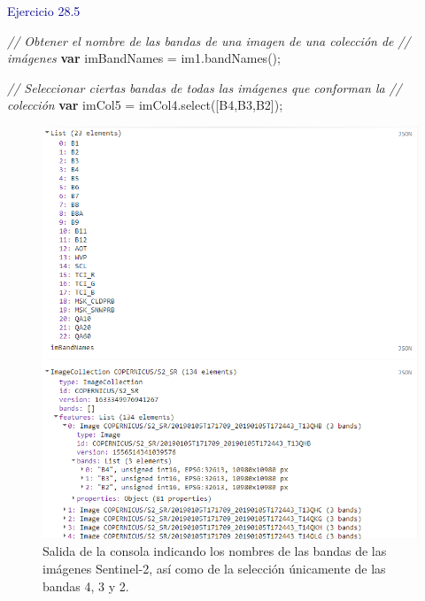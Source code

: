 \documentclass[
  12pt,
  letterpaper,
  twoside]{book}
\newenvironment{Shaded}{\begin{snugshade}}{\end{snugshade}}
\newcommand{\CommentTok}[1]{\textcolor[rgb]{0.24,0.58,0.00}{\textit{#1}}}
\newcommand{\ControlFlowTok}[1]{\textcolor[rgb]{0.00,0.00,0.00}{\textbf{#1}}}
\newcommand{\FunctionTok}[1]{\textcolor[rgb]{0.48,0.12,0.64}{#1}}
\newcommand{\NormalTok}[1]{#1}
\newcommand{\OperatorTok}[1]{\textcolor[rgb]{0.00,0.00,0.00}{#1}}
\newcommand{\StringTok}[1]{\textcolor[rgb]{0.87,0.29,0.22}{#1}}
\begin{document}
\textcolor{darkblue}{Ejercicio 28.5}

\begin{Shaded}
\begin{Highlighting}[]
\CommentTok{// Obtener el nombre de las bandas de una imagen de una colección de }
\CommentTok{// imágenes}
\ControlFlowTok{var}\NormalTok{ imBandNames }\OperatorTok{=}\NormalTok{ im1}\OperatorTok{.}\FunctionTok{bandNames}\NormalTok{()}\OperatorTok{;}

\CommentTok{// Seleccionar ciertas bandas de todas las imágenes que conforman la }
\CommentTok{// colección}
\ControlFlowTok{var}\NormalTok{ imCol5 }\OperatorTok{=}\NormalTok{ imCol4}\OperatorTok{.}\FunctionTok{select}\NormalTok{([}\StringTok{\textquotesingle{}B4\textquotesingle{}}\OperatorTok{,}\StringTok{\textquotesingle{}B3\textquotesingle{}}\OperatorTok{,}\StringTok{\textquotesingle{}B2\textquotesingle{}}\NormalTok{])}\OperatorTok{;}
\end{Highlighting}
\end{Shaded}

\begin{figure}[H]

{\centering \includegraphics[width=0.8\linewidth]{Img/imBandNames1} 

}

\caption{Salida de la consola indicando los nombres de las bandas de las imágenes Sentinel-2, así como de la selección únicamente de las bandas 4, 3 y 2.}\label{fig:f105}
\end{figure}
\end{document}
